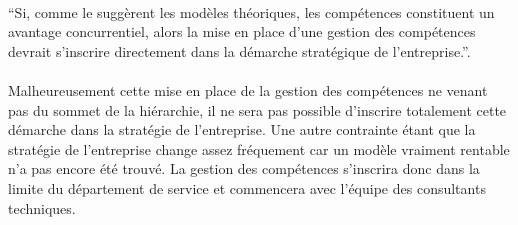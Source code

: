 \paragraph{}\enquote{Si, comme le suggèrent les modèles théoriques, les compétences constituent un avantage concurrentiel, alors la mise en place d'une gestion des compétences devrait s'inscrire directement dans la démarche stratégique de l'entreprise.}\citep[P. 188]{gestionressourceshumaine2007}.

\paragraph{}Malheureusement cette mise en place de la gestion des compétences ne venant pas du sommet de la hiérarchie, il ne sera pas possible d'inscrire totalement cette démarche dans la stratégie de l'entreprise. Une autre contrainte étant que la stratégie de l'entreprise change assez fréquement car un modèle vraiment rentable n'a pas encore été trouvé. La gestion des compétences s'inscrira donc dans la limite du département de service et commencera avec l'équipe des consultants techniques. 

